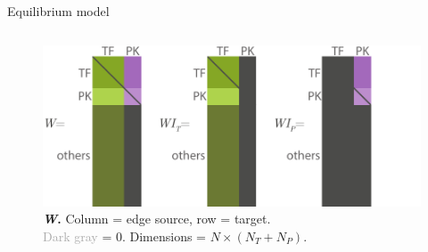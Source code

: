 \begin{frame}{Equilibrium model}
\begin{columns}
\begin{column}{0.5\textwidth}
\begin{figure}[ht]
    \centering
    \includegraphics[width=\textwidth]{methods/fig/W.pdf}
    \caption{\textbf{\textit{W}.} Column = edge source, row = target. \\ \textcolor{darkgray}{Dark gray} = 0. Dimensions = $N \times (N_T + N_P)$. }
    \label{fig:W}
\end{figure}
\end{column}
\end{columns}
\end{frame}

